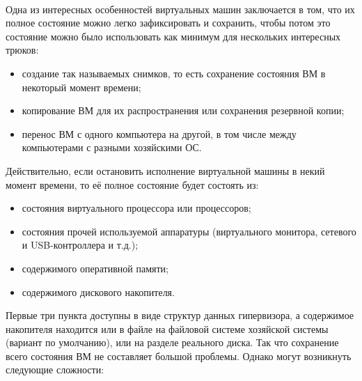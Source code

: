 \documentclass[14pt, a4paper]{article}
\begin{document}
\begin{figure}[h]
    \centering
    \\
    \label{framework} 
\end{figure}

Одна из интересных особенностей виртуальных машин заключается в том, что их полное состояние
можно легко зафиксировать и сохранить, чтобы потом это состояние можно было использовать как
минимум для нескольких интересных трюков:

\begin{itemize}
    \item создание так называемых снимков, то есть сохранение состояния ВМ в некоторый момент
    времени;
    \item копирование ВМ для их распространения или сохранения резервной копии;
    \item перенос ВМ с одного компьютера на другой, в том числе между компьютерами с разными
    хозяйскими ОС.
\end{itemize}

Действительно, если остановить исполнение виртуальной машины в некий момент времени, то её
полное состояние будет состоять из:

\begin{itemize}
    \item состояния виртуального процессора или процессоров;
    \item состояния прочей используемой аппаратуры (виртуального монитора, сетевого и
    USB-контроллера и т.д.);
    \item содержимого оперативной памяти;
    \item содержимого дискового накопителя.
\end{itemize}

Первые три пункта доступны в виде структур данных гипервизора, а содержимое накопителя
находится или в файле на файловой системе хозяйской системы (вариант по умолчанию), или на
разделе реального диска. Так что сохранение всего состояния ВМ не составляет большой проблемы.
Однако могут возникнуть следующие сложности:
\end{document}
